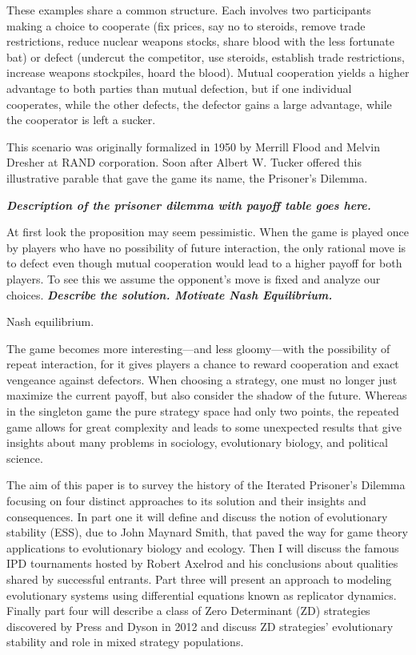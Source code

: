 These examples share a common structure. Each involves two participants making a choice to cooperate (fix prices, say no to steroids, remove trade restrictions, reduce nuclear weapons stocks, share blood with the less fortunate bat) or defect (undercut the competitor, use steroids, establish trade restrictions, increase weapons stockpiles, hoard the blood). Mutual cooperation yields a higher advantage to both parties than mutual defection, but if one individual cooperates, while the other defects, the defector gains a large advantage, while the cooperator is left a sucker.

This scenario was originally formalized in 1950 by Merrill Flood and Melvin Dresher at RAND corporation. Soon after Albert W. Tucker offered this illustrative parable that gave the game its name, the Prisoner's Dilemma.

\textit{\textbf{Description of the prisoner dilemma with payoff table goes here.}}

At first look the proposition may seem pessimistic. When the game is played once by players who have no possibility of future interaction, the only rational move is to defect even though mutual cooperation would lead to a higher payoff for both players. To see this we assume the opponent's move is fixed and analyze our choices. \textit{\textbf{Describe the solution. Motivate Nash Equilibrium.}}
\begin{definition} Nash equilibrium.
\end{definition}

The game becomes more interesting---and less gloomy---with the possibility of repeat interaction, for it gives players a chance to reward cooperation and exact vengeance against defectors. When choosing a strategy, one must no longer just maximize the current payoff, but also consider the shadow of the future. Whereas in the singleton game the pure strategy space had only two points, the repeated game allows for great complexity and leads to some unexpected results that give insights about many problems in sociology, evolutionary biology, and political science.

The aim of this paper is to survey the history of the Iterated Prisoner's Dilemma focusing on four distinct approaches to its solution and their insights and consequences. In part one it will define and discuss the notion of evolutionary stability (ESS), due to John Maynard Smith, that paved the way for game theory applications to evolutionary biology and ecology. Then I will discuss the famous IPD tournaments hosted by Robert Axelrod and his conclusions about qualities shared by successful entrants. Part three will present an approach to modeling evolutionary systems using differential equations known as replicator dynamics. Finally part four will describe a class of Zero Determinant (ZD) strategies discovered by Press and Dyson in 2012 and discuss ZD strategies' evolutionary stability and role in mixed strategy populations.

